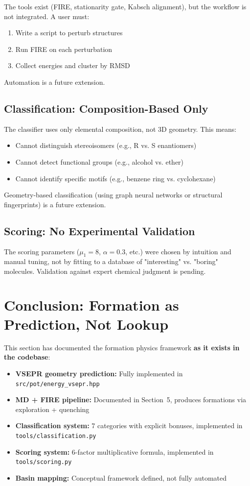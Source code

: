 \documentclass[11pt]{article}
\begin{document}
The tools exist (FIRE, stationarity gate, Kabsch alignment), but the workflow is not integrated. A user must:
\begin{enumerate}
\item Write a script to perturb structures
\item Run FIRE on each perturbation
\item Collect energies and cluster by RMSD
\end{enumerate}

Automation is a future extension.

\subsection{Classification: Composition-Based Only}

The classifier uses only elemental composition, not 3D geometry. This means:
\begin{itemize}
\item Cannot distinguish stereoisomers (e.g., R vs. S enantiomers)
\item Cannot detect functional groups (e.g., alcohol vs. ether)
\item Cannot identify specific motifs (e.g., benzene ring vs. cyclohexane)
\end{itemize}

Geometry-based classification (using graph neural networks or structural fingerprints) is a future extension.

\subsection{Scoring: No Experimental Validation}

The scoring parameters ($\mu_1 = 8$, $\alpha = 0.3$, etc.) were chosen by intuition and manual tuning, not by fitting to a database of "interesting" vs. "boring" molecules. Validation against expert chemical judgment is pending.

\section{Conclusion: Formation as Prediction, Not Lookup}

This section has documented the formation physics framework \textbf{as it exists in the codebase}:

\begin{itemize}
\item \textbf{VSEPR geometry prediction:} Fully implemented in \texttt{src/pot/energy\_vsepr.hpp}
\item \textbf{MD + FIRE pipeline:} Documented in Section~5, produces formations via exploration + quenching
\item \textbf{Classification system:} 7 categories with explicit bonuses, implemented in \texttt{tools/classification.py}
\item \textbf{Scoring system:} 6-factor multiplicative formula, implemented in \texttt{tools/scoring.py}
\item \textbf{Basin mapping:} Conceptual framework defined, not fully automated
\end{itemize}
\end{document}
